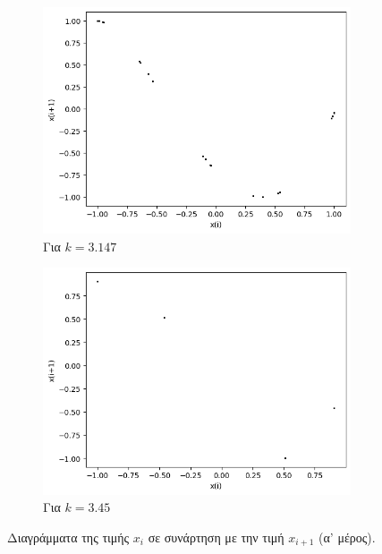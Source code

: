 \begin{figure}[ht]
\begin{subfigure}[b]{0.4\textwidth}
		\includegraphics[width=\textwidth]{LateX images/cheb q=0.8/g8}
		\caption{Για $k=3.147$}
		\label{f:k135}
	\end{subfigure}
	\hfill
	\begin{subfigure}[b]{0.4\textwidth}
		\centering
		\includegraphics[width=\textwidth]{LateX images/cheb q=0.8/g9}
		\caption{Για $k=3.45$}
		\label{f:k136}
	\end{subfigure}
	\hfill	
	\caption{Διαγράμματα της τιμής \(x_i\) σε συνάρτηση με την τιμή \(x_{i+1}\) (α' μέρος).}
	\label{f:k248}
\end{figure}
